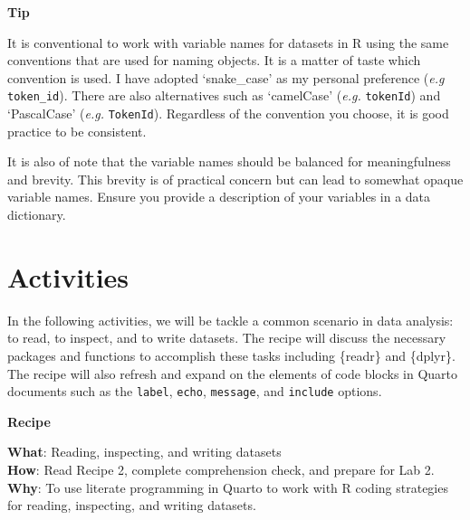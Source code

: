 \documentclass[
  letterpaper,
  krantz1]{latex/krantz-mod}
\theoremstyle{definition}
\theoremstyle{definition}
\theoremstyle{remark}
\begin{document}
\begin{tcolorbox}[enhanced jigsaw, toprule=.15mm, breakable, colback=white, arc=.35mm, left=2mm, colframe=quarto-callout-color-frame, opacityback=0, bottomrule=.15mm, rightrule=.15mm, leftrule=.75mm]

\textbf{ Tip}

It is conventional to work with variable names for datasets in R using
the same conventions that are used for naming objects. It is a matter of
taste which convention is used. I have adopted `snake\_case' as my
personal preference (\emph{e.g} \texttt{token\_id}). There are also
alternatives such as `camelCase' (\emph{e.g.} \texttt{tokenId}) and
`PascalCase' (\emph{e.g.} \texttt{TokenId}). Regardless of the
convention you choose, it is good practice to be
consistent.

It is also of note that the variable names should be balanced for
meaningfulness and brevity. This brevity is of practical concern but can
lead to somewhat opaque variable names. Ensure you provide a description
of your variables in a data dictionary.

\end{tcolorbox}

\section*{Activities}\label{activities}


In the following activities, we will be tackle a common scenario in data
analysis: to read, to inspect, and to write datasets. The recipe will
discuss the necessary packages and functions to accomplish these tasks
including \{readr\} and \{dplyr\}. The recipe will also refresh and
expand on the elements of code blocks in Quarto documents such as the
\texttt{label}, \texttt{echo}, \texttt{message}, and \texttt{include}
options.

\pagebreak

\begin{tcolorbox}[enhanced jigsaw, toprule=.15mm, breakable, colback=white, arc=.35mm, left=2mm, colframe=quarto-callout-color-frame, opacityback=0, bottomrule=.15mm, rightrule=.15mm, leftrule=.75mm]

\textbf{ Recipe}

\textbf{What}: Reading, inspecting, and writing datasets\\
\textbf{How}: Read Recipe 2, complete comprehension check, and prepare
for Lab 2.\\
\textbf{Why}: To use literate programming in Quarto to work with R
coding strategies for reading, inspecting, and writing datasets.

\end{tcolorbox}
\end{document}
